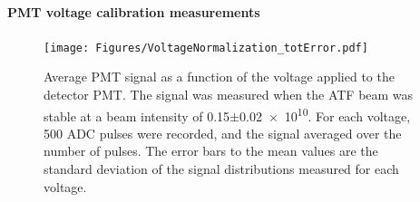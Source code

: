 \paragraph{PMT voltage calibration measurements}
\begin{figure}
\centering
\texttt{[image: Figures/VoltageNormalization\_totError.pdf]}
\caption[RHUL Cherenkov detector voltage calibration]{Average PMT signal as a function of the voltage applied to the detector PMT. The signal was measured when the ATF beam was stable at a beam intensity of \num{0.15}$\pm$\num{0.02e10}. For each voltage, 500 ADC pulses were recorded, and the signal averaged over the number of pulses. The error bars to the mean values are the standard deviation of the signal distributions measured for each voltage.}
\label{fig:VoltageNormalization}
\end{figure}

